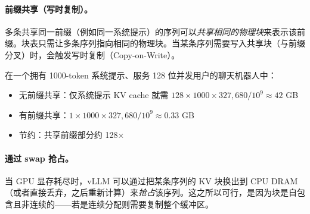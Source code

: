 \paragraph{前缀共享（写时复制）。}
\label{prefix-sharing-copy-on-write.}

多条共享同一前缀（例如同一系统提示）的序列可以\emph{共享相同的物理块}来表示该前缀。块表只需让多条序列指向相同的物理块。当某条序列需要写入共享块（与前缀分叉）时，会触发写时复制（Copy-on-Write）。

\begin{intuitionbox}[前缀共享带来的节约]
在一个拥有 1000-token 系统提示、服务 128 位并发用户的聊天机器人中：

\begin{itemize}
  \item 无前缀共享：仅系统提示 KV cache 就需 $128 \times 1000 \times 327{,}680 / 10^9 \approx 42$ GB
  \item 有前缀共享：$1 \times 1000 \times 327{,}680 / 10^9 \approx 0.33$ GB
  \item 节约：共享前缀部分约 128$\times$
\end{itemize}
\end{intuitionbox}

\paragraph{通过 swap 抢占。}
\label{preemption-via-swap.}

当 GPU 显存耗尽时，vLLM 可以通过把某条序列的 KV 块换出到 CPU DRAM（或者直接丢弃，之后重新计算）来\emph{抢占}该序列。这之所以可行，是因为块是自包含且非连续的——若是连续分配则需要复制整个缓冲区。

